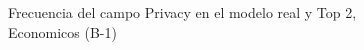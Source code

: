 \begin{figure}[H]
    \centering
    
    \caption{Frecuencia del campo Privacy en el modelo real y Top 2, Economicos (B-1)}
    \label{frecuency-Privacy-top2}
\end{figure}